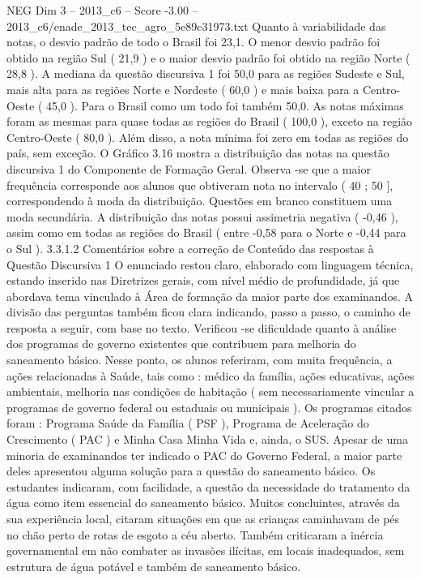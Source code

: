 \begin{textsample}{NEG Dim 3 – 2013\_c6 – Score -3.00 – 2013\_c6/enade\_2013\_tec\_agro\_5e89c31973.txt}
Quanto à variabilidade das notas, o desvio padrão de todo o Brasil foi 23,1.
O menor desvio padrão foi obtido na região Sul ( 21,9 ) e o maior desvio padrão foi obtido na região Norte ( 28,8 ).
A mediana da questão discursiva 1 foi 50,0 para as regiões Sudeste e Sul, mais alta para as regiões Norte e Nordeste ( 60,0 ) e mais baixa para a Centro-Oeste ( 45,0 ).
Para o Brasil como um todo foi também 50,0.
As notas máximas foram as mesmas para quase todas as regiões do Brasil ( 100,0 ), exceto na região Centro-Oeste ( 80,0 ).
Além disso, a nota mínima foi zero em todas as regiões do país, sem exceção.
O Gráfico 3.16 mostra a distribuição das notas na questão discursiva 1 do Componente de Formação Geral.
Observa -se que a maior frequência corresponde aos alunos que obtiveram nota no intervalo ( 40 ; 50 ], correspondendo à moda da distribuição.
Questões em branco constituem uma moda secundária.
A distribuição das notas possui assimetria negativa ( -0,46 ), assim como em todas as regiões do Brasil ( entre -0,58 para o Norte e -0,44 para o Sul ). 3.3.1.2 Comentários sobre a correção de Conteúdo das respostas à Questão Discursiva 1 O enunciado restou claro, elaborado com linguagem técnica, estando inserido nas Diretrizes gerais, com nível médio de profundidade, já que abordava tema vinculado à Área de formação da maior parte dos examinandos.
A divisão das perguntas também ficou clara indicando, passo a passo, o caminho de resposta a seguir, com base no texto.
Verificou -se dificuldade quanto à análise dos programas de governo existentes que contribuem para melhoria do saneamento básico.
Nesse ponto, os alunos referiram, com muita frequência, a ações relacionadas à Saúde, tais como : médico da família, ações educativas, ações ambientais, melhoria nas condições de habitação ( sem necessariamente vincular a programas de governo federal ou estaduais ou municipais ).
Os programas citados foram : Programa Saúde da Família ( PSF ), Programa de Aceleração do Crescimento ( PAC ) e Minha Casa Minha Vida e, ainda, o SUS.
Apesar de uma minoria de examinandos ter indicado o PAC do Governo Federal, a maior parte deles apresentou alguma solução para a questão do saneamento básico.
Os estudantes indicaram, com facilidade, a questão da necessidade do tratamento da água como item essencial do saneamento básico.
Muitos concluintes, através da sua experiência local, citaram situações em que as crianças caminhavam de pés no chão perto de rotas de esgoto a céu aberto.
Também criticaram a inércia governamental em não combater as invasões ilícitas, em locais inadequados, sem estrutura de água potável e também de saneamento básico.

\end{textsample}
